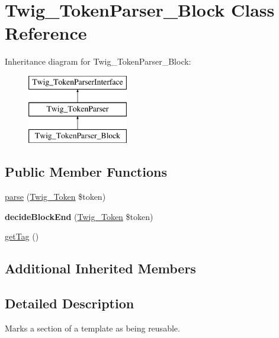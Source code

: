 \hypertarget{class_twig___token_parser___block}{}\section{Twig\+\_\+\+Token\+Parser\+\_\+\+Block Class Reference}
\label{class_twig___token_parser___block}
Inheritance diagram for Twig\+\_\+\+Token\+Parser\+\_\+\+Block\+:\begin{figure}[H]
\begin{center}
\leavevmode
\includegraphics[height=3.000000cm]{class_twig___token_parser___block}
\end{center}
\end{figure}
\subsection*{Public Member Functions}
\begin{DoxyCompactItemize}
\item 
\hyperlink{class_twig___token_parser___block_a5dfa2e269321584fb74e8b43dabe0efd}{parse} (\hyperlink{class_twig___token}{Twig\+\_\+\+Token} \$token)
\item 
\hypertarget{class_twig___token_parser___block_aa976dc013d35c2813752149bacd88902}{}{\bfseries decide\+Block\+End} (\hyperlink{class_twig___token}{Twig\+\_\+\+Token} \$token)\label{class_twig___token_parser___block_aa976dc013d35c2813752149bacd88902}

\item 
\hyperlink{class_twig___token_parser___block_ab86ba36154b20e6bbfa3ba705f12f9d6}{get\+Tag} ()
\end{DoxyCompactItemize}
\subsection*{Additional Inherited Members}


\subsection{Detailed Description}
Marks a section of a template as being reusable.


